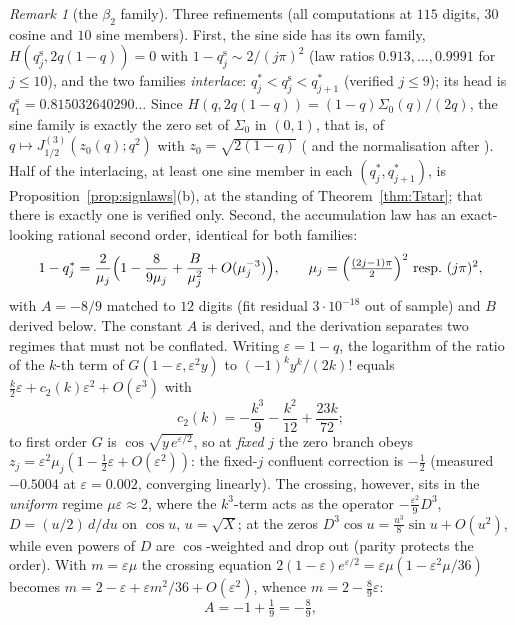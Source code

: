 \documentclass[11pt]{article}
\theoremstyle{plain}
\theoremstyle{definition}
\theoremstyle{remark}
\newtheorem{remark}[theorem]{Remark}
\begin{document}
\begin{remark}[the $\beta_2$ family]
Three refinements (all computations at $115$ digits, $30$ cosine and $10$ sine members). First,
the sine side has its own family, $H(q^{\mathrm s}_j,2q(1-q))=0$ with
$1-q^{\mathrm s}_j\sim2/(j\pi)^2$ (law ratios $0.913,\dots,0.9991$ for $j\le10$), and the two
families \emph{interlace}: $q^\ast_j<q^{\mathrm s}_j<q^\ast_{j+1}$ (verified $j\le9$); its
head is $q^{\mathrm s}_1=0.815032640290\ldots$ Since $H(q,2q(1-q))=(1-q)\Sigma_0(q)/(2q)$, the sine
family is exactly the zero set of $\Sigma_0$ in $(0,1)$, that is, of
$q\mapsto J^{(3)}_{1/2}(z_0(q);q^2)$ with $z_0=\sqrt{2(1-q)}$ ({\cite[Lemma ``the numerators in closed form'', \textup{lem:qsinenum}]{Bonfioli2026bA}} and the
normalisation after {\cite[Proposition \textup{prop:qtrig}]{Bonfioli2026bA}}). Half of the interlacing, at least one sine member
in each $(q^\ast_j,q^\ast_{j+1})$, is Proposition~\ref{prop:signlaws}\textup{(b)}, at the standing
of Theorem~\ref{thm:Tstar}; that there is exactly one is verified only. Second, the accumulation law has an exact-looking
rational second order, identical for both families:
\[
   1-q^\ast_j=\frac{2}{\mu_j}\Bigl(1-\frac{8}{9\mu_j}+\frac{B}{\mu_j^2}
   +O(\mu_j^{-3})\Bigr),\qquad
   \mu_j=\Bigl(\tfrac{(2j-1)\pi}{2}\Bigr)^2\ \text{resp.}\ (j\pi)^2,
\]
with $A=-8/9$ matched to $12$ digits (fit residual $3\cdot10^{-18}$ out of sample) and
$B$ derived below. The constant $A$ is derived, and the derivation separates two regimes that
must not be conflated. Writing $\varepsilon=1-q$, the logarithm of the ratio of the $k$-th term
of $G(1-\varepsilon,\varepsilon^2y)$ to $(-1)^ky^k/(2k)!$ equals
$\tfrac k2\varepsilon+c_2(k)\varepsilon^2+O(\varepsilon^3)$ with
\[
   c_2(k)=-\frac{k^3}{9}-\frac{k^2}{12}+\frac{23k}{72};
\]
to first order $G$ is $\cos\!\sqrt{y\,e^{\varepsilon/2}}$, so at \emph{fixed} $j$ the zero
branch obeys $z_j=\varepsilon^2\mu_j(1-\tfrac12\varepsilon+O(\varepsilon^2))$: the fixed-$j$
confluent correction is $-\tfrac12$ (measured $-0.5004$ at $\varepsilon=0.002$, converging
linearly). The crossing, however, sits in the \emph{uniform} regime $\mu\varepsilon\approx2$,
where the $k^3$-term acts as the operator $-\tfrac{\varepsilon^2}9D^3$, $D=(u/2)\,d/du$ on
$\cos u$, $u=\sqrt{X}$; at the zeros $D^3\cos u=\tfrac{u^3}8\sin u+O(u^2)$, while even powers
of $D$ are $\cos$-weighted and drop out (parity protects the order). With $m=\varepsilon\mu$
the crossing equation $2(1-\varepsilon)e^{\varepsilon/2}=\varepsilon\mu(1-\varepsilon^2\mu/36)$
becomes $m=2-\varepsilon+\varepsilon m^2/36+O(\varepsilon^2)$, whence $m=2-\tfrac89\varepsilon$:
\[
   A=-1+\tfrac19=-\tfrac89 ,
\]
\end{remark}
\end{document}
